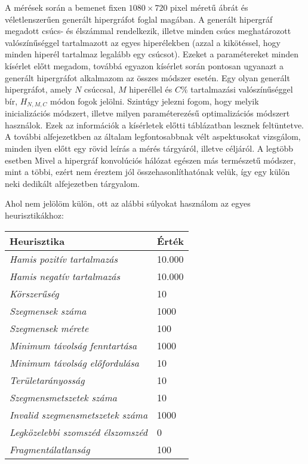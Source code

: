 A mérések során a bemenet fixen $1080 \times 720$ pixel méretű ábrát és véletlenszerűen generált hipergráfot foglal magában. A generált hipergráf megadott csúcs- és élszámmal rendelkezik, illetve minden csúcs meghatározott valószínűséggel tartalmazott az egyes hiperélekben (azzal a kikötéssel, hogy minden hiperél tartalmaz legalább egy csúcsot). Ezeket a paramétereket minden kísérlet előtt megadom, továbbá egyazon kísérlet során pontosan ugyanazt a generált hipergráfot alkalmazom az összes módszer esetén. Egy olyan generált hipergráfot, amely $N$ csúccsal, $M$ hiperéllel és $C\%$ tartalmazási valószínűséggel bír, $H_{N,M,C}$ módon fogok jelölni. Szintúgy jelezni fogom, hogy melyik inicializációs módszert, illetve milyen paraméterezésű optimalizációs módszert használok. Ezek az információk a kísérletek előtti táblázatban lesznek feltüntetve. A további alfejezetkben az általam legfontosabbnak vélt aspektusokat vizsgálom, minden ilyen előtt egy rövid leírás a mérés tárgyáról, illetve céljáról. A legtöbb esetben
Mivel a hipergráf konvolúciós hálózat egészen más természetű módszer, mint a többi, ezért nem éreztem jól összehasonlíthatónak velük, így egy külön neki dedikált alfejezetben tárgyalom.


Ahol nem jelölöm külön, ott az alábbi súlyokat használom az egyes heurisztikákhoz:

\begin{longtable}{| p{} | p{} |}
		\hline
		\hfil\textbf{Heurisztika} & \hfil\textbf{Érték} \\
		\hline \hline
		\emph{Hamis pozitív tartalmazás} & \hfil10.000 \\
		\hline
		\emph{Hamis negatív tartalmazás} & \hfil10.000 \\
		\hline
		\emph{Körszerűség} & \hfil10 \\
		\hline
		\emph{Szegmensek száma} & \hfil1000 \\
		\hline
		\emph{Szegmensek mérete} & \hfil100 \\
		\hline
		\emph{Minimum távolság fenntartása} & \hfil1000 \\
		\hline
		\emph{Minimum távolság előfordulása} &  \hfil10 \\
		\hline
		\emph{Területarányosság} & \hfil10 \\
		\hline
		\emph{Szegmensmetszetek száma} & \hfil10 \\
		\hline
		\emph{Invalid szegmensmetszetek száma} & \hfil1000 \\
		\hline
		\emph{Legközelebbi szomszéd élszomszéd} & \hfil0 \\
		\hline
		\emph{Fragmentálatlanság} & \hfil100 \\
		\hline
\end{longtable}

